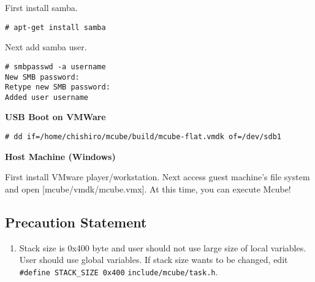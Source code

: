 First install samba.

\noindent
\begin{Sbox}
\begin{minipage}[t]{0.975\linewidth}
\begin{verbatim}
# apt-get install samba
\end{verbatim}
\end{minipage}
\end{Sbox}
\fbox{\TheSbox}

Next add samba user.

\noindent
\begin{Sbox}
\begin{minipage}[t]{0.975\linewidth}
\begin{verbatim}
# smbpasswd -a username
New SMB password:
Retype new SMB password:
Added user username
\end{verbatim}
\end{minipage}
\end{Sbox}
\fbox{\TheSbox}


\textbf{USB Boot on VMWare}


\noindent
\begin{Sbox}
\begin{minipage}[t]{0.975\linewidth}
\begin{verbatim}
# dd if=/home/chishiro/mcube/build/mcube-flat.vmdk of=/dev/sdb1
\end{verbatim}
\end{minipage}
\end{Sbox}
\fbox{\TheSbox}



\textbf{Host Machine (Windows)}

First install VMware player/workstation.
Next access guest machine's file system and open [mcube/vmdk/mcube.vmx].
At this time, you can execute Mcube!



\subsection{Precaution Statement}

\begin{enumerate}
 \setlength{\parskip}{0cm}
 \setlength{\itemsep}{0cm}
 \item Stack size is 0x400 byte and user should not use large size of
   local variables.
   User should use global variables.
   If stack size wants to be changed, edit
   \verb|#define STACK_SIZE 0x400| \verb|include/mcube/task.h|.
\end{enumerate}

